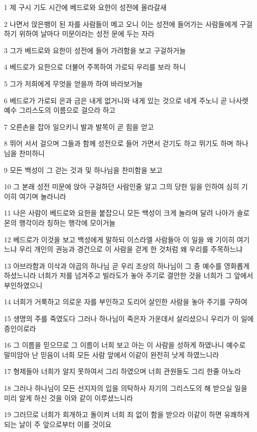 \par 1 제 구시 기도 시간에 베드로와 요한이 성전에 올라갈새
\par 2 나면서 앉은뱅이 된 자를 사람들이 메고 오니 이는 성전에 들어가는 사람들에게 구걸하기 위하여 날마다 미문이라는 성전 문에 두는 자라
\par 3 그가 베드로와 요한이 성전에 들어 가려함을 보고 구걸하거늘
\par 4 베드로가 요한으로 더불어 주목하여 가로되 우리를 보라 하니
\par 5 그가 저희에게 무엇을 얻을까 하여 바라보거늘
\par 6 베드로가 가로되 은과 금은 내게 없거니와 내게 있는 것으로 네게 주노니 곧 나사렛 예수 그리스도의 이름으로 걸으라 하고
\par 7 오른손을 잡아 일으키니 발과 발목이 곧 힘을 얻고
\par 8 뛰어 서서 걸으며 그들과 함께 성전으로 들어 가면서 걷기도 하고 뛰기도 하며 하나님을 찬미하니
\par 9 모든 백성이 그 걷는 것과 및 하나님을 찬미함을 보고
\par 10 그 본래 성전 미문에 앉아 구걸하던 사람인줄 알고 그의 당한 일을 인하여 심히 기이히 여기며 놀라니라
\par 11 나은 사람이 베드로와 요한을 붙잡으니 모든 백성이 크게 놀라며 달려 나아가 솔로몬의 행각이라 칭하는 행각에 모이거늘
\par 12 베드로가 이것을 보고 백성에게 말하되 이스라엘 사람들아 이 일을 왜 기이히 여기느냐 우리 개인의 권능과 경건으로 이 사람을 걷게 한 것처럼 왜 우리를 주목하느냐
\par 13 아브라함과 이삭과 야곱의 하나님 곧 우리 조상의 하나님이 그 종 예수를 영화롭게 하셨느니라 너희가 저를 넘겨주고 빌라도가 놓아 주기로 결안한 것을 너희가 그 앞에서 부인하였으니
\par 14 너희가 거룩하고 의로운 자를 부인하고 도리어 살인한 사람을 놓아 주기를 구하여
\par 15 생명의 주를 죽였도다 그러나 하나님이 죽은자 가운데서 살리셨으니 우리가 이 일에 증인이로라
\par 16 그 이름을 믿으므로 그 이름이 너희 보고 아는 이 사람을 성하게 하였나니 예수로 말미암아 난 믿음이 너희 모든 사람 앞에서 이같이 완전히 낫게 하였느니라
\par 17 형제들아 너희가 알지 못하여서 그리 하였으며 너희 관원들도 그리 한줄 아노라
\par 18 그러나 하나님이 모든 선지자의 입을 의탁하사 자기의 그리스도의 해 받으실 일을 미리 알게 하신 것을 이와 같이 이루셨느니라
\par 19 그러므로 너희가 회개하고 돌이켜 너희 죄 없이 함을 받으라 이같이 하면 유쾌하게 되는 날이 주 앞으로부터 이를 것이요
